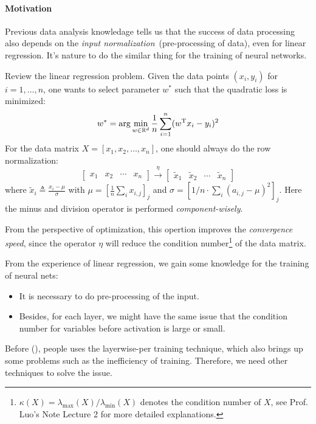 \paragraph{Motivation}
Previous data analysis knowledage tells us that the success of data processing also depends on the \emph{input normalization}~(pre-processing of data), even for linear regression.
It's nature to do the similar thing for the training of neural networks.
\begin{example}
Review the linear regression problem.
Given the data points $(x_i,y_i)$ for $i=1,\dots,n$, one wants to select parameter $w^*$ such that the quadratic loss is minimized:
\[
w^*=\arg\min_{w\in\mathbb{R}^d}\frac{1}{n}\sum_{i=1}^n(w^{\mathrm T} x_i - y_i)^2
\]
For the data matrix $X=[x_1,x_2,\dots,x_n]$, one should always do the row normalization:
\[
\begin{bmatrix}
x_1&x_2&\cdots&x_n
\end{bmatrix}\xrightarrow{\eta}
\begin{bmatrix}
\tilde{x}_1&\tilde{x}_2&\cdots&\tilde{x}_n
\end{bmatrix}
\]
where $\tilde{x}_i\triangleq\frac{x_i - \mu}{\sigma}$ with $\mu=\left[\frac{1}{n}\sum_ix_{i,j}\right]_j$ and $\sigma=\left[1/n\cdot\sum_i(a_{i,j}-\mu)^2\right]_j$. Here the minus and division operator is performed \emph{component-wisely}.

From the perspective of optimization, this opertion improves the \emph{convergence speed}, since the operator $\eta$ will reduce the condition number\footnote{
$\kappa(X)=\lambda_{\max}(X)/\lambda_{\min}(X)$ denotes the condition number of $X$, see Prof. Luo's Note Lecture 2 for more detailed explanations.
} of the data matrix.

From the experience of linear regression, we gain some knowledge for the training of neural nets:
\begin{itemize}
\item
It is necessary to do pre-processing of the input.
\item
Besides, for each layer, we might have the same issue that the condition number for variables before activation is large or small.
\end{itemize} 
Before (\cite{Glorot10understandingthe}), people uses the layerwise-per training technique, which also brings up some problems such as the inefficiency of training.
Therefore, we need other techniques to solve the issue.


\end{example}
